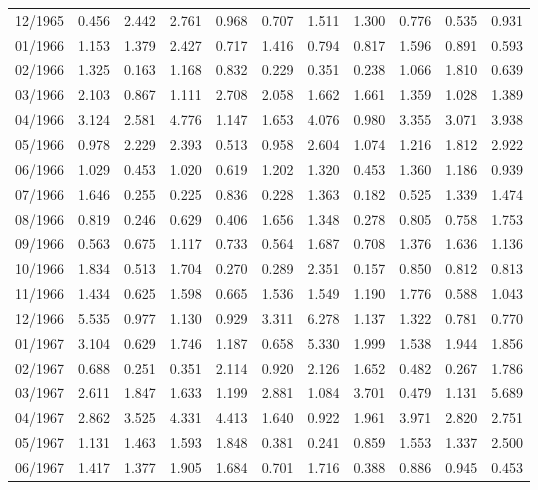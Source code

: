 \begin{tabular}{lrrrrrrrrrr}
12/1965 &  0.456 &  2.442 &  2.761 &  0.968 &  0.707 &  1.511 &  1.300 &  0.776 &  0.535 &  0.931 \\
01/1966 &  1.153 &  1.379 &  2.427 &  0.717 &  1.416 &  0.794 &  0.817 &  1.596 &  0.891 &  0.593 \\
02/1966 &  1.325 &  0.163 &  1.168 &  0.832 &  0.229 &  0.351 &  0.238 &  1.066 &  1.810 &  0.639 \\
03/1966 &  2.103 &  0.867 &  1.111 &  2.708 &  2.058 &  1.662 &  1.661 &  1.359 &  1.028 &  1.389 \\
04/1966 &  3.124 &  2.581 &  4.776 &  1.147 &  1.653 &  4.076 &  0.980 &  3.355 &  3.071 &  3.938 \\
05/1966 &  0.978 &  2.229 &  2.393 &  0.513 &  0.958 &  2.604 &  1.074 &  1.216 &  1.812 &  2.922 \\
06/1966 &  1.029 &  0.453 &  1.020 &  0.619 &  1.202 &  1.320 &  0.453 &  1.360 &  1.186 &  0.939 \\
07/1966 &  1.646 &  0.255 &  0.225 &  0.836 &  0.228 &  1.363 &  0.182 &  0.525 &  1.339 &  1.474 \\
08/1966 &  0.819 &  0.246 &  0.629 &  0.406 &  1.656 &  1.348 &  0.278 &  0.805 &  0.758 &  1.753 \\
09/1966 &  0.563 &  0.675 &  1.117 &  0.733 &  0.564 &  1.687 &  0.708 &  1.376 &  1.636 &  1.136 \\
10/1966 &  1.834 &  0.513 &  1.704 &  0.270 &  0.289 &  2.351 &  0.157 &  0.850 &  0.812 &  0.813 \\
11/1966 &  1.434 &  0.625 &  1.598 &  0.665 &  1.536 &  1.549 &  1.190 &  1.776 &  0.588 &  1.043 \\
12/1966 &  5.535 &  0.977 &  1.130 &  0.929 &  3.311 &  6.278 &  1.137 &  1.322 &  0.781 &  0.770 \\
01/1967 &  3.104 &  0.629 &  1.746 &  1.187 &  0.658 &  5.330 &  1.999 &  1.538 &  1.944 &  1.856 \\
02/1967 &  0.688 &  0.251 &  0.351 &  2.114 &  0.920 &  2.126 &  1.652 &  0.482 &  0.267 &  1.786 \\
03/1967 &  2.611 &  1.847 &  1.633 &  1.199 &  2.881 &  1.084 &  3.701 &  0.479 &  1.131 &  5.689 \\
04/1967 &  2.862 &  3.525 &  4.331 &  4.413 &  1.640 &  0.922 &  1.961 &  3.971 &  2.820 &  2.751 \\
05/1967 &  1.131 &  1.463 &  1.593 &  1.848 &  0.381 &  0.241 &  0.859 &  1.553 &  1.337 &  2.500 \\
06/1967 &  1.417 &  1.377 &  1.905 &  1.684 &  0.701 &  1.716 &  0.388 &  0.886 &  0.945 &  0.453 \\

\end{tabular}

